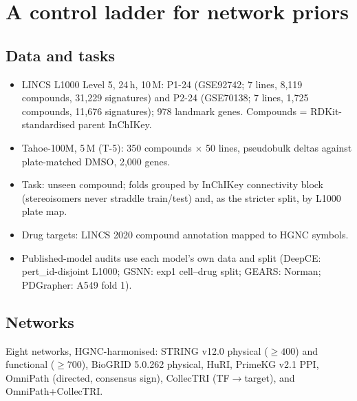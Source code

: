 \section{A control ladder for network priors}
\label{sec:framework}

\subsection{Data and tasks}
\label{sec:data}
\begin{itemize}
  \item LINCS L1000 Level 5, 24\,h, 10\,\textmu M: P1-24 (GSE92742; 7 lines, 8{,}119 compounds,
        31{,}229 signatures) and P2-24 (GSE70138; 7 lines, 1{,}725 compounds, 11{,}676 signatures);
        978 landmark genes. Compounds = RDKit-standardised parent InChIKey.
  \item Tahoe-100M, 5\,\textmu M (T-5): 350 compounds $\times$ 50 lines, pseudobulk deltas against
        plate-matched DMSO, 2{,}000 genes.
  \item Task: unseen compound; folds grouped by InChIKey connectivity block (stereoisomers never
        straddle train/test) and, as the stricter split, by L1000 plate map.
  \item Drug targets: LINCS 2020 compound annotation mapped to HGNC symbols.
  \item Published-model audits use each model's own data and split (DeepCE: pert\_id-disjoint L1000;
        GSNN: exp1 cell--drug split; GEARS: Norman; PDGrapher: A549 fold 1).
\end{itemize}

\subsection{Networks}
Eight networks, HGNC-harmonised: STRING v12.0 physical ($\geq 400$) and functional ($\geq 700$),
BioGRID 5.0.262 physical, HuRI, PrimeKG v2.1 PPI, OmniPath (directed, consensus sign),
CollecTRI (TF$\to$target), and OmniPath+CollecTRI. 

